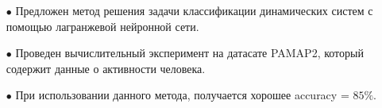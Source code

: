 \documentclass[12pt, twoside]{article}
\begin{document}
    \begin{itemize}
    
        \item[$\bullet$] Предложен метод решения задачи классификации динамических систем с помощью лагранжевой нейронной сети.

        \item[$\bullet$] Проведен вычислительный эксперимент на датасате PAMAP2, который содержит данные о активности человека.
        
        \item[$\bullet$] При использовании данного метода, получается хорошее accuracy = $85\%$.
        
    \end{itemize}



\end{document}
